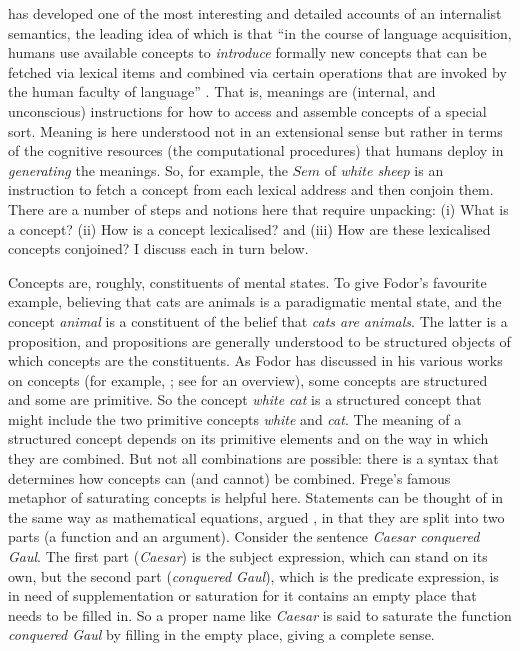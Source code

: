 \citet{Pietroski2008,Pietroski2010,Pietroski2018} has developed one of the most interesting and detailed accounts of an internalist semantics, the leading idea of which is that “in the course of language acquisition, humans use available concepts to \textit{introduce} formally new concepts that can be fetched via lexical items and combined via certain operations that are invoked by the human faculty of language” \citep[247, emphasis in original]{Pietroski2010}. That is, meanings are (internal, and unconscious) instructions for how to access and assemble concepts of a special sort. Meaning is here understood not in an extensional sense but rather in terms of the cognitive resources (the computational procedures) that humans deploy in \textit{generating} the meanings. So, for example, the $Sem$ of \textit{white sheep} is an instruction to fetch a concept from each lexical address and then conjoin them. There are a number of steps and notions here that require unpacking: (i) What is a concept? (ii) How is a concept lexicalised? and (iii) How are these lexicalised concepts conjoined? I discuss each in turn below.
	
Concepts are, roughly, constituents of mental states. To give Fodor’s favourite example, believing that cats are animals is a paradigmatic mental state, and the concept \textit{animal} is a constituent of the belief that \textit{cats are animals}. The latter is a proposition, and propositions are generally understood to be structured objects of which concepts are the constituents. As Fodor has discussed in his various works on concepts (for example, \citealt{Fodor1998,Fodor2003,FodorPylyshyn2015}; see \citealt{Murphy2002} for an overview), some concepts are structured and some are primitive. So the concept \textit{white} \textit{cat} is a structured concept that might include the two primitive concepts \textit{white} and \textit{cat}. The meaning of a structured concept depends on its primitive elements and on the way in which they are combined. But not all combinations are possible: there is a syntax that determines how concepts can (and cannot) be combined. Frege’s famous metaphor of saturating concepts is helpful here. Statements can be thought of in the same way as mathematical equations, argued \citet{Frege1892}, in that they are split into two parts (a function and an argument). Consider the sentence \textit{Caesar conquered Gaul}. The first part (\textit{Caesar}) is the subject expression, which can stand on its own, but the second part (\textit{conquered Gaul}), which is the predicate expression, is in need of supplementation or saturation for it contains an empty place that needs to be filled in. So a proper name like \textit{Caesar} is said to saturate the function \textit{conquered Gaul }by filling in the empty place, giving a complete sense. 

